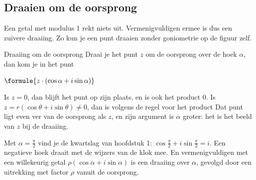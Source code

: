 
\begin{oefeningen}

\end{oefeningen}

\subsection{Draaien om de oorsprong}

Een getal met modulus 1 rekt niets uit. Vermenigvuldigen ermee is dus een zuivere draaiing. Zo kun je een punt draaien zonder goniometrie op de figuur zelf.

\begin{theorie}
\begin{stelling}{Draaiing om de oorsprong}
Draai je het punt $z$ om de oorsprong over de hoek $\alpha$, dan kom je in het punt

\vspace{1mm}
\qquad $\formule{z \cdot (\cos\alpha + i\sin\alpha)}$
\end{stelling}

\begin{bewijs}
Is $z = 0$, dan blijft het punt op zijn plaats, en is ook het product 0. Is $z = r(\cos\theta + i\sin\theta) \neq 0$, dan is volgens de regel voor het product
Dat punt ligt even ver van de oorsprong als $z$, en zijn argument is $\alpha$ groter: het is het beeld van $z$ bij de draaiing.
\end{bewijs}
\end{theorie}

Met $\alpha = \frac{\pi}{2}$ vind je de kwartslag van hoofdstuk 1: $\cos\frac{\pi}{2} + i\sin\frac{\pi}{2} = i$. Een negatieve hoek draait met de wijzers van de klok mee. En vermenigvuldigen met een willekeurig getal $\rho(\cos\alpha + i\sin\alpha)$ is een draaiing over $\alpha$, gevolgd door een uitrekking met factor $\rho$ vanuit de oorsprong.

